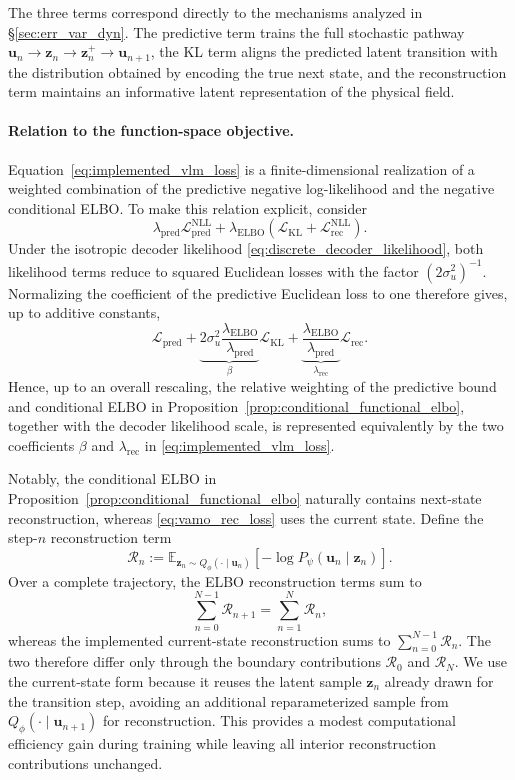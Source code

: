 \documentclass[11pt]{article}
\begin{document}
The three terms correspond directly to the mechanisms analyzed in \S\ref{sec:err_var_dyn}. The predictive term trains the full stochastic pathway $\mathbf u_n\to\mathbf z_n\to\mathbf z_n^+\to\mathbf u_{n+1}$, the KL term aligns the predicted latent transition with the distribution obtained by encoding the true next state, and the reconstruction term maintains an informative latent representation of the physical field.

\paragraph{Relation to the function-space objective.} 
Equation~\eqref{eq:implemented_vlm_loss} is a finite-dimensional realization of a weighted combination of the predictive negative log-likelihood and the negative conditional ELBO. To make this relation explicit, consider
\[
    \lambda_{\mathrm{pred}}
    \mathcal L_{\mathrm{pred}}^{\mathrm{NLL}}
    +
    \lambda_{\mathrm{ELBO}}
    \left(
        \mathcal L_{\mathrm{KL}}+\mathcal L_{\mathrm{rec}}^{\mathrm{NLL}}
    \right).
\]
Under the isotropic decoder likelihood \eqref{eq:discrete_decoder_likelihood}, both likelihood terms reduce to squared Euclidean losses with the factor $(2\sigma_u^2)^{-1}$. Normalizing the coefficient of the predictive Euclidean loss to one therefore gives, up to additive constants,
\[
    \mathcal L_{\mathrm{pred}}
    +\underbrace{
    2\sigma_u^2\frac{\lambda_{\mathrm{ELBO}}}{\lambda_{\mathrm{pred}}}}_{\beta}\mathcal L_{\mathrm{KL}}
    +\underbrace{\frac{\lambda_{\mathrm{ELBO}}}{\lambda_{\mathrm{pred}}}}_{\lambda_{\mathrm{rec}}}\mathcal L_{\mathrm{rec}}.
\]
Hence, up to an overall rescaling, the relative weighting of the predictive bound and conditional ELBO in Proposition~\ref{prop:conditional_functional_elbo}, together with the decoder likelihood scale, is represented equivalently by the two coefficients $\beta$ and $\lambda_{\mathrm{rec}}$ in \eqref{eq:implemented_vlm_loss}.

Notably, the conditional ELBO in
Proposition~\ref{prop:conditional_functional_elbo} naturally contains next-state reconstruction, whereas \eqref{eq:vamo_rec_loss} uses the current state. Define the step-$n$ reconstruction term
\[
    \mathcal R_n
    :=
    \mathbb E_{\mathbf z_n\sim Q_\phi(\cdot\mid\mathbf u_n)}
    \left[
        -\log P_\psi(\mathbf u_n\mid\mathbf z_n)
    \right].
\]
Over a complete trajectory, the ELBO reconstruction terms sum to
\[
    \sum_{n=0}^{N-1}\mathcal R_{n+1}
    =
    \sum_{n=1}^{N}\mathcal R_n,
\]
whereas the implemented current-state reconstruction sums to $\sum_{n=0}^{N-1}\mathcal R_n$. The two therefore differ only through the boundary contributions $\mathcal R_0$ and $\mathcal R_N$. We use the current-state form because it reuses the latent sample $\mathbf z_n$ already drawn for the transition step, avoiding an additional reparameterized sample from $Q_\phi(\cdot\mid\mathbf u_{n+1})$ for reconstruction. This provides a modest computational efficiency gain during training while leaving all interior reconstruction contributions unchanged.
\end{document}
